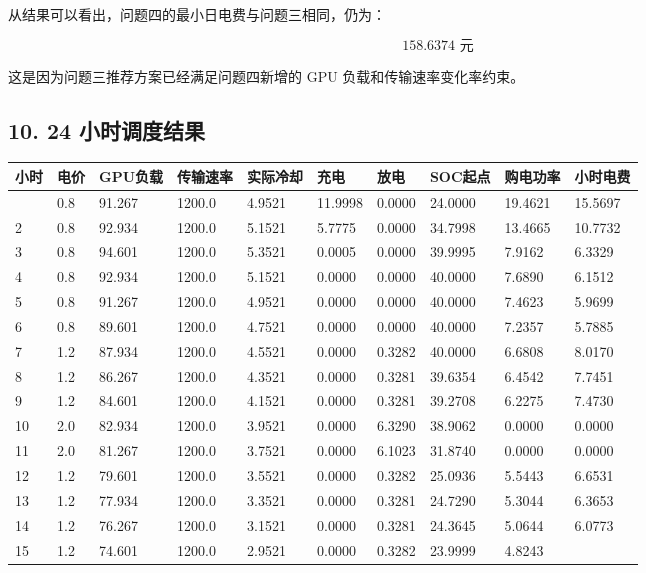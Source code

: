 \documentclass[
]{article}
\begin{document}
从结果可以看出，问题四的最小日电费与问题三相同，仍为：

\[158.6374\text{ 元}\]

这是因为问题三推荐方案已经满足问题四新增的 GPU
负载和传输速率变化率约束。

\subsection{10. 24
小时调度结果}\label{10-24-ux5c0fux65f6ux8c03ux5ea6ux7ed3ux679c}

\begin{longtable}[]{@{}llllllllll@{}}
\toprule\noalign{}
小时 & 电价 & GPU负载 & 传输速率 & 实际冷却 & 充电 & 放电 & SOC起点 &
购电功率 & 小时电费 \\
\midrule\noalign{}
\endhead
\bottomrule\noalign{}
\endlastfoot
1 & 0.8 & 91.267 & 1200.0 & 4.9521 & 11.9998 & 0.0000 & 24.0000 &
19.4621 & 15.5697 \\
2 & 0.8 & 92.934 & 1200.0 & 5.1521 & 5.7775 & 0.0000 & 34.7998 & 13.4665
& 10.7732 \\
3 & 0.8 & 94.601 & 1200.0 & 5.3521 & 0.0005 & 0.0000 & 39.9995 & 7.9162
& 6.3329 \\
4 & 0.8 & 92.934 & 1200.0 & 5.1521 & 0.0000 & 0.0000 & 40.0000 & 7.6890
& 6.1512 \\
5 & 0.8 & 91.267 & 1200.0 & 4.9521 & 0.0000 & 0.0000 & 40.0000 & 7.4623
& 5.9699 \\
6 & 0.8 & 89.601 & 1200.0 & 4.7521 & 0.0000 & 0.0000 & 40.0000 & 7.2357
& 5.7885 \\
7 & 1.2 & 87.934 & 1200.0 & 4.5521 & 0.0000 & 0.3282 & 40.0000 & 6.6808
& 8.0170 \\
8 & 1.2 & 86.267 & 1200.0 & 4.3521 & 0.0000 & 0.3281 & 39.6354 & 6.4542
& 7.7451 \\
9 & 1.2 & 84.601 & 1200.0 & 4.1521 & 0.0000 & 0.3281 & 39.2708 & 6.2275
& 7.4730 \\
10 & 2.0 & 82.934 & 1200.0 & 3.9521 & 0.0000 & 6.3290 & 38.9062 & 0.0000
& 0.0000 \\
11 & 2.0 & 81.267 & 1200.0 & 3.7521 & 0.0000 & 6.1023 & 31.8740 & 0.0000
& 0.0000 \\
12 & 1.2 & 79.601 & 1200.0 & 3.5521 & 0.0000 & 0.3282 & 25.0936 & 5.5443
& 6.6531 \\
13 & 1.2 & 77.934 & 1200.0 & 3.3521 & 0.0000 & 0.3281 & 24.7290 & 5.3044
& 6.3653 \\
14 & 1.2 & 76.267 & 1200.0 & 3.1521 & 0.0000 & 0.3281 & 24.3645 & 5.0644
& 6.0773 \\
15 & 1.2 & 74.601 & 1200.0 & 2.9521 & 0.0000 & 0.3282 & 23.9999 & 4.8243

\end{longtable}
\end{document}
